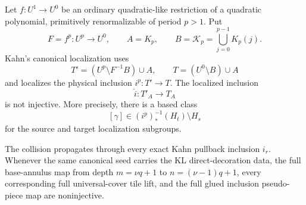 \begin{theorem}\label{thm:forced-collision}
Let \(f:U^1\to U^0\) be an ordinary quadratic-like restriction of a quadratic polynomial, primitively renormalizable of period \(p>1\). Put
\[
F=f^{p}:U^{p}\to U^{0},\qquad A=K_p,\qquad B=\mathcal K_p=\bigcup_{j=0}^{p-1}K_p(j).
\]
Kahn's canonical localization uses
\[
T'=(U^{p}\setminus F^{-1}B)\cup A,\qquad T=(U^{0}\setminus B)\cup A
\]
and localizes the physical inclusion \(i^{p}:T'\to T\). The localized inclusion
\[
\hat i:T'_A\longrightarrow T_A
\]
is not injective. More precisely, there is a based class
\[
[\gamma]\in(i^{p})_*^{-1}(H_t)\setminus H_s
\]
for the source and target localization subgroups.

The collision propagates through every exact Kahn pullback inclusion \(i_r\). Whenever the same canonical seed carries the KL direct-decoration data, the full base-annulus map from depth \(m=\nu q+1\) to \(n=(\nu-1)q+1\), every corresponding full universal-cover tile lift, and the full glued inclusion pseudo-piece map are noninjective.
\end{theorem}

